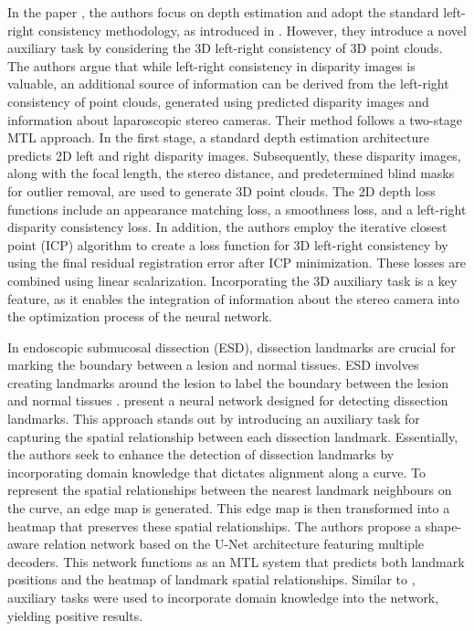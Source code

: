 \documentclass[times,twocolumn,final]{elsarticle}
\begin{document}
In the paper \citet{ss_depth_estimation_laparo}, the authors focus on depth estimation and adopt the standard left-right consistency methodology, as introduced in \citet{monodepth17}. However, they introduce a novel auxiliary task by considering the 3D left-right consistency of 3D point clouds. The authors argue that while left-right consistency in disparity images is valuable, an additional source of information can be derived from the left-right consistency of point clouds, generated using predicted disparity images and information about laparoscopic stereo cameras.
Their method follows a two-stage MTL approach. In the first stage, a standard depth estimation architecture predicts 2D left and right disparity images. Subsequently, these disparity images, along with the focal length, the stereo distance, and predetermined blind masks for outlier removal, are used to generate 3D point clouds. The 2D depth loss functions include an appearance matching loss, a smoothness loss, and a left-right disparity consistency loss. In addition, the authors employ the iterative closest point (ICP) algorithm \citep{besl1992method} to create a loss function for 3D left-right consistency by using the final residual registration error after ICP minimization. These losses are combined using linear scalarization.
Incorporating the 3D auxiliary task is a key feature, as it enables the integration of information about the stereo camera into the optimization process of the neural network.

In endoscopic submucosal dissection (ESD), dissection landmarks are crucial for marking the boundary between a lesion and normal tissues. ESD involves creating landmarks around the lesion to label the boundary between the lesion and normal tissues \citep{ono2021guidelines}. \citet{landmark_detection_submucosal} present a neural network designed for detecting dissection landmarks.
This approach stands out by introducing an auxiliary task for capturing the spatial relationship between each dissection landmark. Essentially, the authors seek to enhance the detection of dissection landmarks by incorporating domain knowledge that dictates alignment along a curve. To represent the spatial relationships between the nearest landmark neighbours on the curve, an edge map is generated. This edge map is then transformed into a heatmap that preserves these spatial relationships.
The authors propose a shape-aware relation network based on the U-Net architecture featuring multiple decoders. This network functions as an MTL system that predicts both landmark positions and the heatmap of landmark spatial relationships. Similar to \citet{ss_depth_estimation_laparo}, auxiliary tasks were used to incorporate domain knowledge into the network, yielding positive results.
\end{document}
